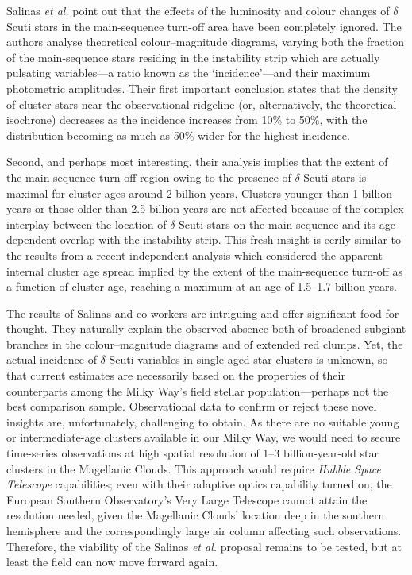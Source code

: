 \documentclass{natureprintstyle2}
\begin{document}
Salinas {\it et al.}\cite{ref2} point out that the effects of the
luminosity and colour changes of $\delta$ Scuti stars in the
main-sequence turn-off area have been completely ignored. The authors
analyse theoretical colour--magnitude diagrams, varying both the
fraction of the main-sequence stars residing in the instability strip
which are actually pulsating variables---a ratio known as the
`incidence'---and their maximum photometric amplitudes. Their first
important conclusion states that the density of cluster stars near the
observational ridgeline (or, alternatively, the theoretical isochrone)
decreases as the incidence increases from 10\% to 50\%, with the
distribution becoming as much as 50\% wider for the highest incidence.

Second, and perhaps most interesting, their analysis implies that the
extent of the main-sequence turn-off region owing to the presence of
$\delta$ Scuti stars is maximal for cluster ages around 2 billion
years. Clusters younger than 1 billion years or those older than 2.5
billion years are not affected because of the complex interplay
between the location of $\delta$ Scuti stars on the main sequence and
its age-dependent overlap with the instability strip. This fresh
insight is eerily similar to the results from a recent independent
analysis which considered the apparent internal cluster age spread
implied by the extent of the main-sequence turn-off as a function of
cluster age, reaching a maximum at an age of 1.5--1.7 billion
years\cite{ref7}.

The results of Salinas and co-workers are intriguing and offer
significant food for thought. They naturally explain the observed
absence both of broadened subgiant branches in the colour--magnitude
diagrams\cite{ref8} and of extended red clumps\cite{ref9}. Yet, the
actual incidence of $\delta$ Scuti variables in single-aged star
clusters is unknown, so that current estimates are necessarily based
on the properties of their counterparts among the Milky Way's field
stellar population---perhaps not the best comparison
sample. Observational data to confirm or reject these novel 
\vfill\eject\noindent
insights
are, unfortunately, challenging to obtain. As there are no suitable
young or intermediate-age clusters available in our Milky Way, we
would need to secure time-series observations at high spatial
resolution of 1--3 billion-year-old star clusters in the Magellanic
Clouds. This approach would require {\sl Hubble Space Telescope}
capabilities; even with their adaptive optics capability turned on,
the European Southern Observatory's Very Large Telescope cannot attain
the resolution needed, given the Magellanic Clouds' location deep in
the southern hemisphere and the correspondingly large air column
affecting such observations. Therefore, the viability of the Salinas
{\it et al.} proposal remains to be tested, but at least the field can
now move forward again.
\end{document}
